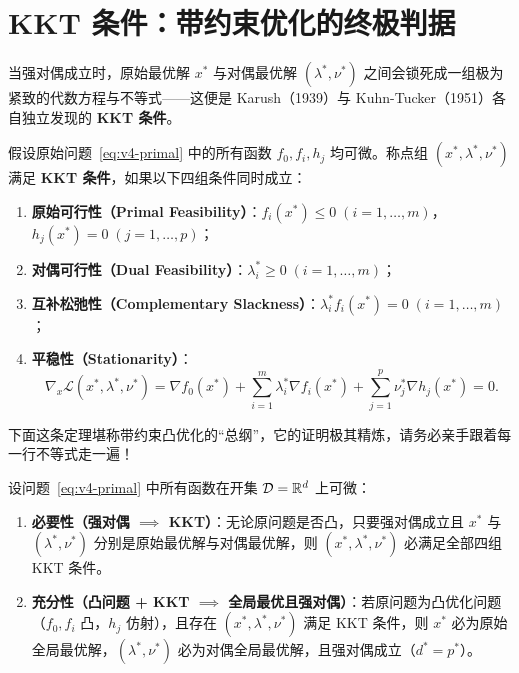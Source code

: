 \section{KKT 条件：带约束优化的终极判据}

当强对偶成立时，原始最优解 $x^*$ 与对偶最优解 $(\lambda^*, \nu^*)$ 之间会锁死成一组极为紧致的代数方程与不等式——这便是 Karush（1939）与 Kuhn-Tucker（1951）各自独立发现的 \textbf{KKT 条件}。

\begin{defBox}
\begin{definition}\label{def:v4-kkt}
假设原始问题~\eqref{eq:v4-primal} 中的所有函数 $f_0, f_i, h_j$ 均可微。称点组 $(x^*, \lambda^*, \nu^*)$ 满足 \textbf{KKT 条件}，如果以下四组条件同时成立：
\begin{enumerate}
  \item \textbf{原始可行性（Primal Feasibility）}：$f_i(x^*) \le 0\;(i=1,\dots,m)$，$h_j(x^*) = 0\;(j=1,\dots,p)$；
  \item \textbf{对偶可行性（Dual Feasibility）}：$\lambda_i^* \ge 0\;(i=1,\dots,m)$；
  \item \textbf{互补松弛性（Complementary Slackness）}：$\lambda_i^* f_i(x^*) = 0\;(i=1,\dots,m)$；
  \item \textbf{平稳性（Stationarity）}：
  \[
    \nabla_x \mathcal{L}(x^*, \lambda^*, \nu^*) = \nabla f_0(x^*) + \sum_{i=1}^m \lambda_i^* \nabla f_i(x^*) + \sum_{j=1}^p \nu_j^* \nabla h_j(x^*) = 0.
  \]
\end{enumerate}
\end{definition}
\end{defBox}

下面这条定理堪称带约束凸优化的“总纲”，它的证明极其精炼，请务必亲手跟着每一行不等式走一遍！

\begin{thmBox}
\begin{theorem}\label{thm:v4-kkt-thm}
设问题~\eqref{eq:v4-primal} 中所有函数在开集 $\mathcal{D} = \mathbb{R}^d$ 上可微：
\begin{enumerate}
  \item \textbf{必要性（强对偶 $\implies$ KKT）}：无论原问题是否凸，只要强对偶成立且 $x^*$ 与 $(\lambda^*, \nu^*)$ 分别是原始最优解与对偶最优解，则 $(x^*, \lambda^*, \nu^*)$ 必满足全部四组 KKT 条件。
  \item \textbf{充分性（凸问题 + KKT $\implies$ 全局最优且强对偶）}：若原问题为凸优化问题（$f_0, f_i$ 凸，$h_j$ 仿射），且存在 $(x^*, \lambda^*, \nu^*)$ 满足 KKT 条件，则 $x^*$ 必为原始全局最优解，$(\lambda^*, \nu^*)$ 必为对偶全局最优解，且强对偶成立（$d^* = p^*$）。
\end{enumerate}
\end{theorem}
\end{thmBox}

